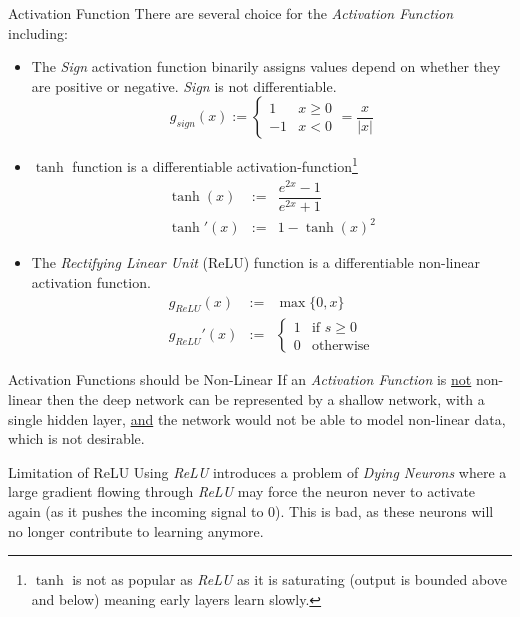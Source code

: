 \documentclass[11pt,a4paper]{article}
\begin{document}
  \begin{proposition}{Activation Function}
    There are several choice for the \textit{Activation Function} including:
    \begin{itemize}
      \item The \textit{Sign} activation function binarily assigns values depend on whether they are positive or negative. \textit{Sign} is not differentiable.
      \[ g_{sign}(x):=\begin{cases}1&x\geq0\\-1&x<0\end{cases}=\frac{x}{|x|} \]

      \item $\tanh$ function is a differentiable activation-function\footnote{$\tanh$ is not as popular as \textit{ReLU} as it is saturating (output is bounded above and below) meaning early layers learn slowly.}
      \[\begin{array}{rcl}
          \tanh(x)&:=&\dfrac{e^{2x}-1}{e^{2x}+1}\\
          \tanh'(x)&:=&1-\tanh(x)^2
      \end{array}\]

      \item The \textit{Rectifying Linear Unit} (ReLU) function is a differentiable non-linear activation function.
      \[\begin{array}{rcl}
          g_{ReLU}(x)&:=&\max\{0,x\}\\
          g_{ReLU}'(x)&:=&\begin{cases}1&\text{if }s\geq0\\0&\text{otherwise}\end{cases}
      \end{array}\]

    \end{itemize}
  \end{proposition}

  \begin{remark}{Activation Functions should be Non-Linear}
    If an \textit{Activation Function} is \underline{not} non-linear then the deep network can be represented by a shallow network, with a single hidden layer, \underline{and} the network would not be able to model non-linear data, which is not desirable.
  \end{remark}

  \begin{remark}{Limitation of ReLU}
    Using \textit{ReLU} introduces a problem of \textit{Dying Neurons} where a large gradient flowing through \textit{ReLU} may force the neuron never to activate again (as it pushes the incoming signal to 0). This is bad, as these neurons will no longer contribute to learning anymore.
  \end{remark}
\end{document}
